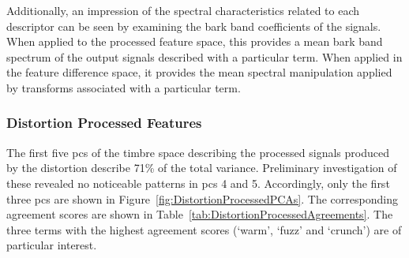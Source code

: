 		Additionally, an impression of the spectral characteristics related to each descriptor can be seen by
		examining the bark band coefficients of the signals. When applied to the processed feature space, this
		provides a mean bark band spectrum of the output signals described with a particular term. When applied in
		the feature difference space, it provides the mean spectral manipulation applied by transforms associated
		with a particular term.

		\subsubsection*{Distortion Processed Features}
			The first five \acrshort{pc}s of the timbre space describing the processed signals produced by the
			distortion describe 71\% of the total variance. Preliminary investigation of these revealed no
			noticeable patterns in \acrshort{pc}s 4 and 5. Accordingly, only the first three \acrshort{pc}s are
			shown in Figure~\ref{fig:DistortionProcessedPCAs}. The corresponding agreement scores are shown in
			Table~\ref{tab:DistortionProcessedAgreements}. The three terms with the highest agreement scores
			(`warm', `fuzz' and `crunch') are of particular interest.

